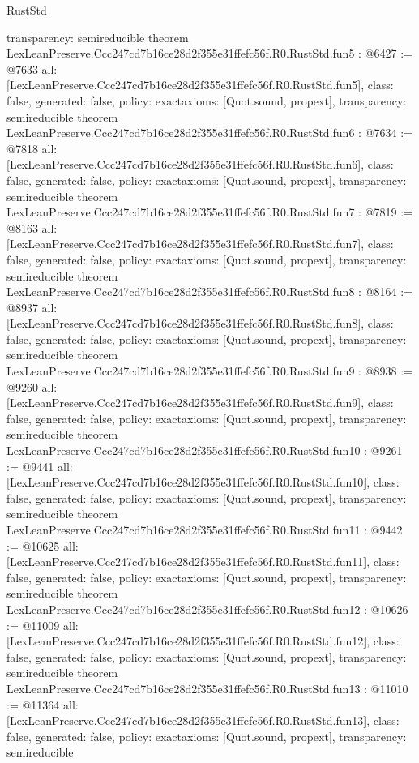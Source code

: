 \begin{lexlean}{RustStd}
\begin{coremodule}
{  transparency: semireducible
}
theorem LexLeanPreserve.Ccc247cd7b16ce28d2f355e31ffefc56f.R0.RustStd.fun5 : @6427 := @7633 {
  all: [LexLeanPreserve.Ccc247cd7b16ce28d2f355e31ffefc56f.R0.RustStd.fun5],
  class: false,
  generated: false,
  policy: exact{axioms: [Quot.sound, propext]},
  transparency: semireducible
}
theorem LexLeanPreserve.Ccc247cd7b16ce28d2f355e31ffefc56f.R0.RustStd.fun6 : @7634 := @7818 {
  all: [LexLeanPreserve.Ccc247cd7b16ce28d2f355e31ffefc56f.R0.RustStd.fun6],
  class: false,
  generated: false,
  policy: exact{axioms: [Quot.sound, propext]},
  transparency: semireducible
}
theorem LexLeanPreserve.Ccc247cd7b16ce28d2f355e31ffefc56f.R0.RustStd.fun7 : @7819 := @8163 {
  all: [LexLeanPreserve.Ccc247cd7b16ce28d2f355e31ffefc56f.R0.RustStd.fun7],
  class: false,
  generated: false,
  policy: exact{axioms: [Quot.sound, propext]},
  transparency: semireducible
}
theorem LexLeanPreserve.Ccc247cd7b16ce28d2f355e31ffefc56f.R0.RustStd.fun8 : @8164 := @8937 {
  all: [LexLeanPreserve.Ccc247cd7b16ce28d2f355e31ffefc56f.R0.RustStd.fun8],
  class: false,
  generated: false,
  policy: exact{axioms: [Quot.sound, propext]},
  transparency: semireducible
}
theorem LexLeanPreserve.Ccc247cd7b16ce28d2f355e31ffefc56f.R0.RustStd.fun9 : @8938 := @9260 {
  all: [LexLeanPreserve.Ccc247cd7b16ce28d2f355e31ffefc56f.R0.RustStd.fun9],
  class: false,
  generated: false,
  policy: exact{axioms: [Quot.sound, propext]},
  transparency: semireducible
}
theorem LexLeanPreserve.Ccc247cd7b16ce28d2f355e31ffefc56f.R0.RustStd.fun10 : @9261 := @9441 {
  all: [LexLeanPreserve.Ccc247cd7b16ce28d2f355e31ffefc56f.R0.RustStd.fun10],
  class: false,
  generated: false,
  policy: exact{axioms: [Quot.sound, propext]},
  transparency: semireducible
}
theorem LexLeanPreserve.Ccc247cd7b16ce28d2f355e31ffefc56f.R0.RustStd.fun11 : @9442 := @10625 {
  all: [LexLeanPreserve.Ccc247cd7b16ce28d2f355e31ffefc56f.R0.RustStd.fun11],
  class: false,
  generated: false,
  policy: exact{axioms: [Quot.sound, propext]},
  transparency: semireducible
}
theorem LexLeanPreserve.Ccc247cd7b16ce28d2f355e31ffefc56f.R0.RustStd.fun12 : @10626 := @11009 {
  all: [LexLeanPreserve.Ccc247cd7b16ce28d2f355e31ffefc56f.R0.RustStd.fun12],
  class: false,
  generated: false,
  policy: exact{axioms: [Quot.sound, propext]},
  transparency: semireducible
}
theorem LexLeanPreserve.Ccc247cd7b16ce28d2f355e31ffefc56f.R0.RustStd.fun13 : @11010 := @11364 {
  all: [LexLeanPreserve.Ccc247cd7b16ce28d2f355e31ffefc56f.R0.RustStd.fun13],
  class: false,
  generated: false,
  policy: exact{axioms: [Quot.sound, propext]},
  transparency: semireducible
}
\end{coremodule}
\end{lexlean}
